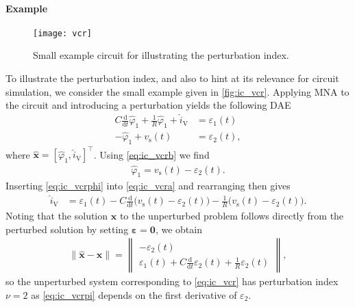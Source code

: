 \documentclass[AMA,STIX1COL]{WileyNJD-v2}
\newcommand{\mb}[1]{\mathbf{#1}}
\newcommand{\mbh}[1]{\hat{\mathbf{#1}}}
\newcommand{\mr}[1]{\mathrm{#1}}
\newcommand{\T}{{\!\top}}
\newcommand{\ddt}{\frac{\mathrm{d}}{\mathrm{d}t}}
\begin{document}
\paragraph{Example}
\begin{figure}[b]
    \begin{center}
        \texttt{[image: vcr]}
    \end{center}
    \caption{Small example circuit for illustrating the perturbation index.}
    \label{fig:ic_vcr}
\end{figure}
To illustrate the perturbation index, and also to hint at its relevance for circuit simulation, we consider the small example given in \autoref{fig:ic_vcr}. Applying MNA to the circuit and introducing a perturbation yields the following DAE
\begin{subequations}
    \label{eq:ic_vcr}
    \begin{align}
        C \ddt \hat{\varphi}_1 + \frac{1}{R} \hat{\varphi}_1 + \hat{i}_\mr{V} &= \varepsilon_1(t) \label{eq:ic_vcra}\\
        -\hat{\varphi}_1 + v_\mr{s}(t) &= \varepsilon_2(t), \label{eq:ic_vcrb}
    \end{align}
\end{subequations}
where $\mbh{x} = [\hat{\varphi}_1, \hat{i}_\mr{V}]^\T$. Using \eqref{eq:ic_vcrb} we find
\begin{align}
    \hat{\varphi}_1 = v_\mr{s}(t) - \varepsilon_2(t). \label{eq:ic_vcrphi}
\end{align}
Inserting \eqref{eq:ic_vcrphi} into \eqref{eq:ic_vcra} and rearranging then gives
\begin{align*}
    \hat{i}_\mr{V} &= \varepsilon_1(t) - C \ddt \big( v_\mr{s}(t) - \varepsilon_2(t) \big) - \frac{1}{R} \big( v_\mr{s}(t) - \varepsilon_2(t) \big).
\end{align*}
Noting that the solution $\mb{x}$ to the unperturbed problem follows directly from the perturbed solution by setting $\boldsymbol{\varepsilon} = \mb{0}$, we obtain
\begin{align}
    \| \mbh{x} - \mb{x} \| = \begin{Vmatrix}
        -\varepsilon_2(t)\\
        \varepsilon_1(t) + C \ddt \varepsilon_2(t) + \frac{1}{R} \varepsilon_2(t)
    \end{Vmatrix}, \label{eq:ic_vcrpi}
\end{align}
so the unperturbed system corresponding to \eqref{eq:ic_vcr} has perturbation index $\nu = 2$ as \eqref{eq:ic_vcrpi} depends on the first derivative of $\varepsilon_2$.
\end{document}
